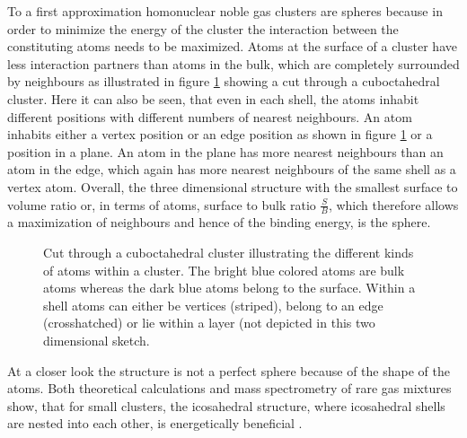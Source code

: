 To a first approximation homonuclear noble gas clusters are spheres
because in order to minimize
the energy of the cluster the interaction between the constituting atoms needs to be
maximized. Atoms at the surface of a cluster have less interaction
partners than atoms in the bulk, which are completely surrounded by neighbours
as illustrated in figure \ref{figure:cluster_cut} showing
a cut through a cuboctahedral cluster.
Here it can also be seen, that even in each shell, the atoms inhabit different
positions with different numbers of nearest neighbours.
An atom inhabits either a vertex position or an edge position
as shown in figure \ref{figure:cluster_cut} or a position in a plane.
An atom
in the plane has more nearest neighbours than an atom in the edge, which again
has more nearest neighbours of the same shell as a vertex atom.
Overall, the three dimensional structure
with the smallest surface to volume ratio or, in terms of atoms, surface to bulk
ratio $\frac{S}{B}$, which therefore allows a maximization of neighbours and
hence of the binding
energy, is the sphere. 


\begin{figure}[h]
 \centering
 
 \caption{Cut through a cuboctahedral cluster illustrating the different
          kinds of atoms within a cluster. The bright blue colored atoms
          are bulk atoms whereas the dark blue atoms belong to the surface.
          Within a shell atoms can either be vertices (striped), belong to
          an edge (crosshatched) or lie within a layer (not depicted in this
          two dimensional sketch.}
 \label{figure:cluster_cut}
\end{figure}


At a closer look the structure is not a perfect sphere
because of the shape of the atoms.
Both theoretical
calculations and mass spectrometry of rare gas mixtures show, that
for small clusters, the icosahedral structure, where icosahedral
shells are nested into each other, is energetically beneficial
\cite{Echt81,Mackay62,Bjorneholm09,Martin96}.


